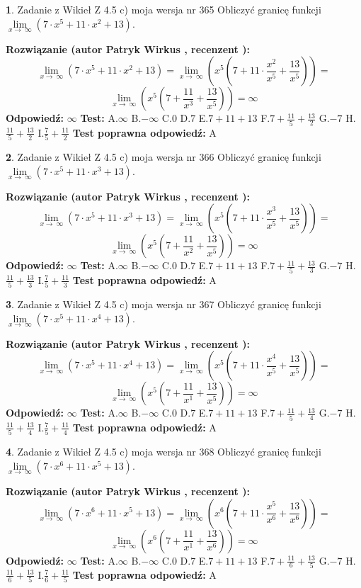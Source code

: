 \documentclass[12pt, a4paper]{article}
\theoremstyle{definition} %
\newtheorem{zad}{}
\newcommand{\zadStart}[1]{\begin{zad}#1\newline}
\newcommand{\zadStop}{\end{zad}}
\newcommand{\rozwStart}[2]{\noindent \textbf{Rozwiązanie (autor #1 , recenzent #2): }\newline}
\newcommand{\rozwStop}{\newline}
\newcommand{\odpStart}{\noindent \textbf{Odpowiedź:}\newline}
\newcommand{\odpStop}{\newline}
\newcommand{\testStart}{\noindent \textbf{Test:}\newline}
\newcommand{\testStop}{\newline}
\newcommand{\kluczStart}{\noindent \textbf{Test poprawna odpowiedź:}\newline}
\newcommand{\kluczStop}{\newline}
\begin{document}
\zadStart{Zadanie z Wikieł Z 4.5 c) moja wersja nr 365}
Obliczyć granicę funkcji  $\lim\limits_{x\to\ \infty}(7 \cdot x^{5}+11 \cdot x^{2}+13)$.
\zadStop
\rozwStart{Patryk Wirkus}{}
$$\lim\limits_{x\to\ \infty}(7 \cdot x^{5}+11 \cdot x^{2}+13) = \lim\limits_{x\to\ \infty}(x^{5}(7 +11 \cdot \frac{x^{2}}{x^{5}}+\frac{13}{x^{5}})) =$$ $$\lim\limits_{x\to\ \infty}(x^{5}(7 +\frac{11}{x^{3}}+\frac{13}{x^{5}})) =\infty$$
\rozwStop
\odpStart
$\infty$
\odpStop
\testStart
A.$\infty$ B.$-\infty$ C.$0$ D.$7$ E.$7 + 11 + 13$
F.$7+\frac{11}{5}+\frac{13}{2}$ G.$-7$
H.$\frac{11}{5}+\frac{13}{2}$
I.$\frac{7}{5}+\frac{11}{2}$
\testStop
\kluczStart
A
\kluczStop



\zadStart{Zadanie z Wikieł Z 4.5 c) moja wersja nr 366}
Obliczyć granicę funkcji  $\lim\limits_{x\to\ \infty}(7 \cdot x^{5}+11 \cdot x^{3}+13)$.
\zadStop
\rozwStart{Patryk Wirkus}{}
$$\lim\limits_{x\to\ \infty}(7 \cdot x^{5}+11 \cdot x^{3}+13) = \lim\limits_{x\to\ \infty}(x^{5}(7 +11 \cdot \frac{x^{3}}{x^{5}}+\frac{13}{x^{5}})) =$$ $$\lim\limits_{x\to\ \infty}(x^{5}(7 +\frac{11}{x^{2}}+\frac{13}{x^{5}})) =\infty$$
\rozwStop
\odpStart
$\infty$
\odpStop
\testStart
A.$\infty$ B.$-\infty$ C.$0$ D.$7$ E.$7 + 11 + 13$
F.$7+\frac{11}{5}+\frac{13}{3}$ G.$-7$
H.$\frac{11}{5}+\frac{13}{3}$
I.$\frac{7}{5}+\frac{11}{3}$
\testStop
\kluczStart
A
\kluczStop



\zadStart{Zadanie z Wikieł Z 4.5 c) moja wersja nr 367}
Obliczyć granicę funkcji  $\lim\limits_{x\to\ \infty}(7 \cdot x^{5}+11 \cdot x^{4}+13)$.
\zadStop
\rozwStart{Patryk Wirkus}{}
$$\lim\limits_{x\to\ \infty}(7 \cdot x^{5}+11 \cdot x^{4}+13) = \lim\limits_{x\to\ \infty}(x^{5}(7 +11 \cdot \frac{x^{4}}{x^{5}}+\frac{13}{x^{5}})) =$$ $$\lim\limits_{x\to\ \infty}(x^{5}(7 +\frac{11}{x^{1}}+\frac{13}{x^{5}})) =\infty$$
\rozwStop
\odpStart
$\infty$
\odpStop
\testStart
A.$\infty$ B.$-\infty$ C.$0$ D.$7$ E.$7 + 11 + 13$
F.$7+\frac{11}{5}+\frac{13}{4}$ G.$-7$
H.$\frac{11}{5}+\frac{13}{4}$
I.$\frac{7}{5}+\frac{11}{4}$
\testStop
\kluczStart
A
\kluczStop



\zadStart{Zadanie z Wikieł Z 4.5 c) moja wersja nr 368}
Obliczyć granicę funkcji  $\lim\limits_{x\to\ \infty}(7 \cdot x^{6}+11 \cdot x^{5}+13)$.
\zadStop
\rozwStart{Patryk Wirkus}{}
$$\lim\limits_{x\to\ \infty}(7 \cdot x^{6}+11 \cdot x^{5}+13) = \lim\limits_{x\to\ \infty}(x^{6}(7 +11 \cdot \frac{x^{5}}{x^{6}}+\frac{13}{x^{6}})) =$$ $$\lim\limits_{x\to\ \infty}(x^{6}(7 +\frac{11}{x^{1}}+\frac{13}{x^{6}})) =\infty$$
\rozwStop
\odpStart
$\infty$
\odpStop
\testStart
A.$\infty$ B.$-\infty$ C.$0$ D.$7$ E.$7 + 11 + 13$
F.$7+\frac{11}{6}+\frac{13}{5}$ G.$-7$
H.$\frac{11}{6}+\frac{13}{5}$
I.$\frac{7}{6}+\frac{11}{5}$
\testStop
\kluczStart
A
\kluczStop
\end{document}
